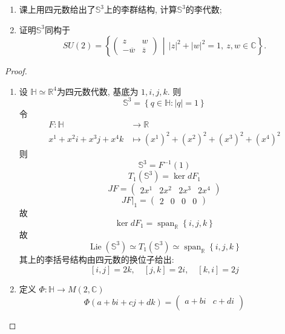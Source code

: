 \documentclass[../main.tex]{subfiles}
\begin{document}
\begin{exercise}{}{}
\begin{enumerate}
\item 课上用四元数给出了\(\mathbb{S}^{3}\)上的李群结构, 计算\(\mathbb{S}^{3}\)的李代数;
\item 证明\(\mathbb{S}^{3}\)同构于
\[
SU(2)=\left\{\begin{pmatrix} z & w \\ -\overline{w} & \overline{z} \end{pmatrix}\,\middle|\,|z|^{2}+|w|^{2}=1,\ z,w\in\mathbb{C}\right\}.
\]
\end{enumerate}
\end{exercise}

\begin{proof}
    \begin{enumerate}
        \item 设 \(  \mathbb{H}\simeq \mathbb{R} ^{4}  \)为四元数代数, 基底为 \(  1,i,j,k  \).   则 \[
        \mathbb{S}^{3}= \left\{ q\in \mathbb{H}: \left| q \right|= 1  \right\}
        \]  令 \[
       \begin{aligned}
        F: \mathbb{H}&\to \mathbb{R} \\ 
         x^{1}+ x^{2}i+ x^{3}j + x^{4}k&\mapsto \left( x^{1} \right)^{2}+ \left( x^{2} \right)^{2}+ \left( x^{3} \right)^{2}+ \left( x^{4} \right)^{2}    
       \end{aligned}
        \]  则 \[
        \mathbb{S}^{3}= F^{-1} \left( 1 \right) 
        \]\[
        T_{1}\left( \mathbb{S}^{3} \right)= \operatorname{ker} d F _{1}
        \] \[
        JF= \begin{pmatrix} 
              2x^{1}&2x^{2}&2x^{3}&2x^{4}
        \end{pmatrix} 
        \] \[
        JF|_{1}= \begin{pmatrix} 
            2&0&0&0 
        \end{pmatrix} 
        \] 故 \[
        \operatorname{ker} d F_{1}= \operatorname{span}_{\mathbb{R} }\left\{ i,j,k \right\}
        \]故 \[
        \operatorname{Lie}\left( \mathbb{S}^{3} \right)\simeq T_{1}\left( \mathbb{S}^{3} \right)\simeq \operatorname{span}_{\mathbb{R} }\left\{ i,j,k \right\}  
        \]其上的李括号结构由四元数的换位子给出: \[
        [i,j]= 2k,\quad [j,k]= 2i,\quad [k,i]= 2j
        \]
        \item 定义 \(  \Phi : \mathbb{H}\to M\left( 2,\mathbb{C}  \right)   \) \[
        \Phi \left( a+ bi+ cj +  dk \right)= \begin{pmatrix} 
            a+ bi& c+  di\\ 

\end{pmatrix}\]
\end{enumerate}
\end{proof}
\end{document}
